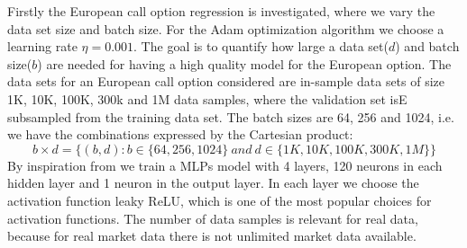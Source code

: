 Firstly the European call option regression is investigated, where we vary the data set size and batch size. For the Adam optimization algorithm we choose a learning rate $\eta=0.001$. The goal is to quantify how large a data set($d$) and batch size($b$) are needed for having a high quality model for the European option. The data sets for an European call option considered are in-sample data sets of size 1K, 10K, 100K, 300k and 1M data samples, where the validation set isE subsampled from the training data set. The batch sizes are 64, 256 and 1024, i.e. we have the combinations expressed by the Cartesian product:
$$b \times d = \{(b, d) : b \in \{64, 256, 1024\} \ and \ d \in\{1K,10K,100K,300K,1M \} \}$$
By inspiration from \parencite{HirsaAli2019} we train a MLPs model with 4 layers, 120 neurons in each hidden layer and 1 neuron in the output layer. In each layer we choose the activation function leaky ReLU, which is one of the most popular choices for activation functions. The number of data samples is relevant for real data, because for real market data there is not unlimited market data available.\\

